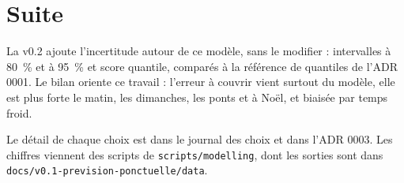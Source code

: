 \documentclass[11pt,a4paper]{article}
\begin{document}
\section{Suite}

La v0.2 ajoute l'incertitude autour de ce modèle, sans le modifier : intervalles à 80~\% et à 95~\% et score quantile, comparés à la référence de quantiles de l'ADR 0001. Le bilan oriente ce travail : l'erreur à couvrir vient surtout du modèle, elle est plus forte le matin, les dimanches, les ponts et à Noël, et biaisée par temps froid.

Le détail de chaque choix est dans le journal des choix et dans l'ADR 0003. Les chiffres viennent des scripts de \nolinkurl{scripts/modelling}, dont les sorties sont dans \nolinkurl{docs/v0.1-prevision-ponctuelle/data}.
\end{document}
